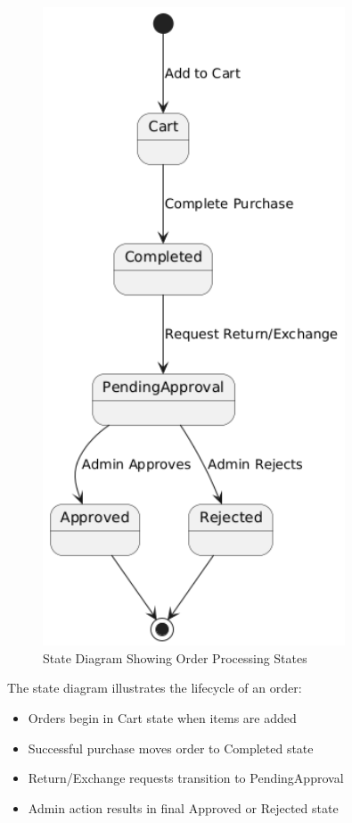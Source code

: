 \documentclass[12pt,a4paper]{article}
\begin{document}
\begin{figure}[H]
    \centering
    \includegraphics[width=0.8\textwidth]{UML diagrams/state_diagram.png}
    \caption{State Diagram Showing Order Processing States}
\end{figure}

The state diagram illustrates the lifecycle of an order:
\begin{itemize}
    \item Orders begin in Cart state when items are added
    \item Successful purchase moves order to Completed state
    \item Return/Exchange requests transition to PendingApproval
    \item Admin action results in final Approved or Rejected state
\end{itemize}
\end{document}

